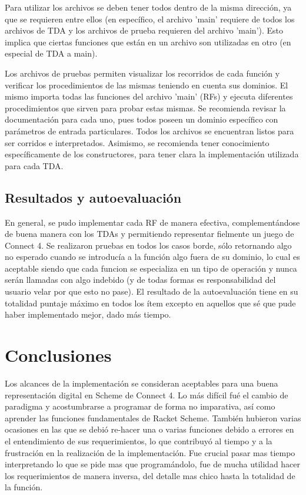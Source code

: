 \documentclass[12pt]{article}
\begin{document}
    Para utilizar los archivos se deben tener todos dentro de la misma dirección, ya que se requieren entre ellos (en específico, el archivo 'main' requiere de todos los archivos de TDA y los archivos de prueba requieren del archivo 'main'). Esto implica que ciertas funciones que están en un archivo son utilizadas en otro (en especial de TDA a main). 
    
    Los archivos de pruebas permiten visualizar los recorridos de cada función y verificar los procedimientos de las mismas teniendo en cuenta sus dominios. El mismo importa todas las funciones del archivo 'main' (RFs) y ejecuta diferentes procedimientos que sirven para probar estas mismas. Se recomienda revisar la documentación para cada uno, pues todos poseen un dominio específico con parámetros de entrada particulares. Todos los archivos se encuentran listos para ser corridos e interpretados. Asimismo, se recomienda tener conocimiento específicamente de los constructores, para tener clara la implementación utilizada para cada TDA.
    
    \subsection{Resultados y autoevaluación}
    
    En general, se pudo implementar cada RF de manera efectiva, complementándose de buena manera con los TDAs y permitiendo representar fielmente un juego de Connect 4. Se realizaron pruebas en todos los casos borde, sólo retornando algo no esperado cuando se introducía a la función algo fuera de su dominio, lo cual es aceptable siendo que cada funcion se especializa en un tipo de operación y nunca serán llamadas con algo indebido (y de todas formas es responsabilidad del usuario velar por que esto no pase). El resultado de la autoevaluación tiene en su totalidad puntaje máximo en todos los ítem excepto en aquellos que sé que pude haber implementado mejor, dado más tiempo.

    \section{Conclusiones}
    
    Los alcances de la implementación se consideran aceptables para una buena representación digital en Scheme de Connect 4. Lo más difícil fué el cambio de paradigma y acostumbrarse a programar de forma no imparativa, así como aprender las funciones fundamentales de Racket Scheme. También hubieron varias ocasiones en las que se debió re-hacer una o varias funciones debido a errores en el entendimiento de sus requerimientos, lo que contribuyó al tiempo y a la frustración en la realización de la implementación. Fue crucial pasar mas tiempo interpretando lo que se pide mas que programándolo, fue de mucha utilidad hacer los requerimientos de manera inversa, del detalle mas chico hasta la totalidad de la función.
    
\end{document}

